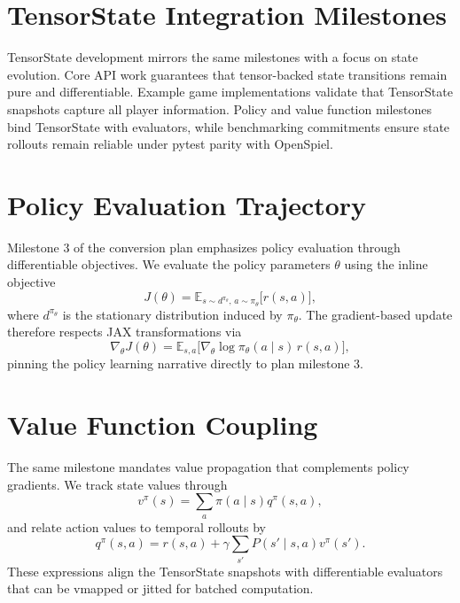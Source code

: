 \documentclass{article}
\begin{document}
\section{TensorState Integration Milestones}
TensorState development mirrors the same milestones with a focus on state evolution. Core API work guarantees that tensor-backed
state transitions remain pure and differentiable. Example game implementations validate that TensorState snapshots capture all
player information. Policy and value function milestones bind TensorState with evaluators, while benchmarking commitments ensure
state rollouts remain reliable under pytest parity with OpenSpiel.

\section{Policy Evaluation Trajectory}
Milestone 3 of the conversion plan emphasizes policy evaluation through differentiable objectives. We evaluate the policy parameters $\theta$ using the inline objective
\begin{equation*}
  J(\theta) = \mathbb{E}_{s \sim d^{\pi_\theta},\, a \sim \pi_\theta}\bigl[r(s, a)\bigr],
\end{equation*}
where $d^{\pi_\theta}$ is the stationary distribution induced by \(\pi_\theta\). The gradient-based update therefore respects JAX transformations via
\begin{equation*}
  \nabla_\theta J(\theta) = \mathbb{E}_{s, a}\bigl[\nabla_\theta \log \pi_\theta(a \mid s)\, r(s, a)\bigr],
\end{equation*}
pinning the policy learning narrative directly to plan milestone 3.

\section{Value Function Coupling}
The same milestone mandates value propagation that complements policy gradients. We track state values through
\begin{equation*}
  v^{\pi}(s) = \sum_a \pi(a \mid s) q^{\pi}(s, a),
\end{equation*}
and relate action values to temporal rollouts by
\begin{equation*}
  q^{\pi}(s, a) = r(s, a) + \gamma \sum_{s'} P(s' \mid s, a) v^{\pi}(s').
\end{equation*}
These expressions align the TensorState snapshots with differentiable evaluators that can be vmapped or jitted for batched computation.
\end{document}
